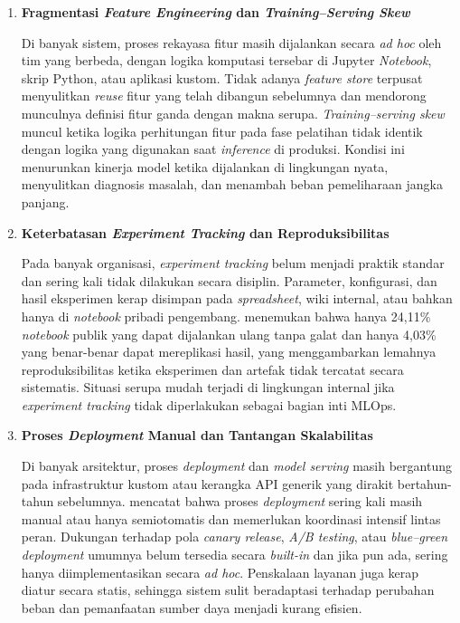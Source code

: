 \vspace{0.5em}
\begin{enumerate}
    \item \textbf{Fragmentasi \textit{Feature Engineering} dan \textit{Training–Serving Skew}}
    
    Di banyak sistem, proses rekayasa fitur masih dijalankan secara \textit{ad hoc} oleh tim yang berbeda, dengan logika komputasi tersebar di Jupyter \textit{Notebook}, skrip Python, atau aplikasi kustom. Tidak adanya \textit{feature store} terpusat menyulitkan \textit{reuse} fitur yang telah dibangun sebelumnya dan mendorong munculnya definisi fitur ganda dengan makna serupa. \textit{Training–serving skew} muncul ketika logika perhitungan fitur pada fase pelatihan tidak identik dengan logika yang digunakan saat \textit{inference} di produksi. Kondisi ini menurunkan kinerja model ketika dijalankan di lingkungan nyata, menyulitkan diagnosis masalah, dan menambah beban pemeliharaan jangka panjang.

    \vspace{0.5em}

    \item \textbf{Keterbatasan \textit{Experiment Tracking} dan Reproduksibilitas}
    
    Pada banyak organisasi, \textit{experiment tracking} belum menjadi praktik standar dan sering kali tidak dilakukan secara disiplin. Parameter, konfigurasi, dan hasil eksperimen kerap disimpan pada \textit{spreadsheet}, wiki internal, atau bahkan hanya di \textit{notebook} pribadi pengembang. \textcite{pimentel2019notebooks} menemukan bahwa hanya 24{,}11\% \textit{notebook} publik yang dapat dijalankan ulang tanpa galat dan hanya 4{,}03\% yang benar-benar dapat mereplikasi hasil, yang menggambarkan lemahnya reproduksibilitas ketika eksperimen dan artefak tidak tercatat secara sistematis. Situasi serupa mudah terjadi di lingkungan internal jika \textit{experiment tracking} tidak diperlakukan sebagai bagian inti MLOps.

    \vspace{0.5em}

    \item \textbf{Proses \textit{Deployment} Manual dan Tantangan Skalabilitas}
    
    Di banyak arsitektur, proses \textit{deployment} dan \textit{model serving} masih bergantung pada infrastruktur kustom atau kerangka API generik yang dirakit bertahun-tahun sebelumnya. \textcite{shankar2022operationalizing} mencatat bahwa proses \textit{deployment} sering kali masih manual atau hanya semiotomatis dan memerlukan koordinasi intensif lintas peran. Dukungan terhadap pola \textit{canary release}, \textit{A/B testing}, atau \textit{blue--green deployment} umumnya belum tersedia secara \textit{built-in} dan jika pun ada, sering hanya diimplementasikan secara \textit{ad hoc}. Penskalaan layanan juga kerap diatur secara statis, sehingga sistem sulit beradaptasi terhadap perubahan beban dan pemanfaatan sumber daya menjadi kurang efisien.


\end{enumerate}
